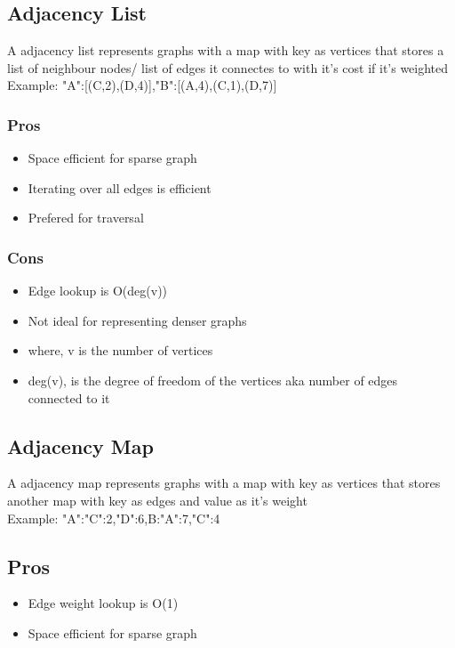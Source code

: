 \documentclass[12pt]{extarticle}
\begin{document}
\subsection{Adjacency List}
A adjacency list represents graphs with a map with key as vertices that stores a list of 
neighbour nodes/ list of edges it connectes to with it's cost if it's weighted \\
Example: {"A":[(C,2),(D,4)],"B":[(A,4),(C,1),(D,7)]}

\subsubsection*{Pros}
\begin{itemize}
    \item Space efficient for sparse graph
    \item Iterating over all edges is efficient
    \item Prefered for traversal 
\end{itemize}

\subsubsection*{Cons}
\begin{itemize}
    \item Edge lookup is O(deg(v))
    \item Not ideal for representing denser graphs
    \item where, v is the number of vertices
    \item deg(v), is the degree of freedom of the vertices aka number of edges connected to it
\end{itemize}

\subsection{Adjacency Map}
A adjacency map represents graphs with a map with key as vertices that stores another map with key 
as edges and value as it's weight \\
Example: {"A":{"C":2,"D":6},B:{"A":7,"C":4}}
\subsection*{Pros}
\begin{itemize}
    \item Edge weight lookup is O(1)
    \item Space efficient for sparse graph
\end{itemize}
\end{document}
